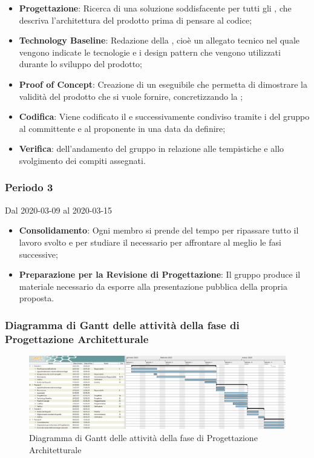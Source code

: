 \begin{itemize}
	\item \textbf{Progettazione}: Ricerca di una soluzione soddisfacente per tutti gli , che descriva l'architettura del prodotto prima di pensare al codice;
	\item \textbf{Technology Baseline}: Redazione della , cioè un allegato tecnico nel quale vengono indicate le tecnologie e i design pattern che vengono utilizzati durante lo sviluppo del prodotto;
	\item \textbf{Proof of Concept}: Creazione di un eseguibile che permetta di dimostrare la validità del prodotto che si vuole fornire, concretizzando la ;
	\item \textbf{Codifica}: Viene codificato il  e successivamente condiviso tramite i  del gruppo al committente e al proponente in una data da definire;
	\item \textbf{Verifica}:  dell'andamento del gruppo in relazione alle tempistiche e allo svolgimento dei compiti assegnati.
\end{itemize}

\subsubsection{Periodo 3} 
Dal 2020-03-09 al 2020-03-15
\begin{itemize}
	\item \textbf{Consolidamento}: Ogni membro si prende del tempo per ripassare tutto il lavoro svolto e per studiare il necessario per affrontare al meglio le fasi successive;
	\item \textbf{Preparazione per la Revisione di Progettazione}: Il gruppo produce il materiale necessario da esporre alla presentazione pubblica della propria proposta.
\end{itemize}


\newpage
\begin{landscape}
\subsubsection{Diagramma di Gantt delle attività della fase di Progettazione Architetturale}
\pagestyle{empty}
\begin{figure}[h]
	\centering
	\includegraphics[scale=1.48]{Sezioni/DiagrammiGantt/ProgettazioneArchitetturale.png}
	\caption{Diagramma di Gantt delle attività della fase di Progettazione Architetturale}	
\end{figure}
\end{landscape}

